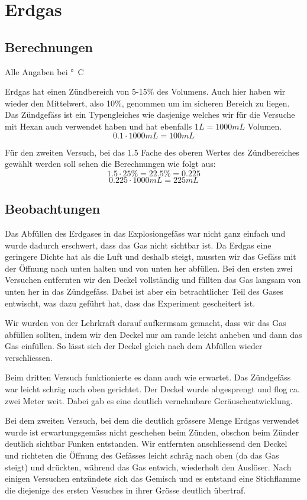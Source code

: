 \documentclass[11pt,paper=a4,final]{scrartcl}
\begin{document}
\section{Erdgas}
\subsection{Berechnungen}
Alle Angaben bei \unit[20]{°C}

Erdgas hat einen Z\"undbereich von 5-15\% des Volumens. Auch hier haben wir
wieder den Mittelwert, also 10\%, genommen um im sicheren Bereich zu liegen. Das
Z\"undgef\"ass ist ein Typengleiches wie dasjenige welches wir f\"ur die
Versuche mit Hexan auch verwendet haben und hat ebenfalls \(1L = 1000mL\)
Volumen.
\[ 0.1 \cdot 1000mL = 100mL \]

F\"ur den zweiten Versuch, bei das 1.5 Fache des oberen Wertes des
Z\"undbereiches gew\"ahlt werden soll sehen die Berechnungen wie folgt aus:
\[ 1.5 \cdot 25\% = 22.5\% = 0.225 \]
\[ 0.225 \cdot 1000mL = 225mL \]
\subsection{Beobachtungen}
Das Abf\"ullen des Erdgases in das Explosiongef\"ass war nicht ganz einfach und
wurde dadurch erschwert, dass das Gas nicht sichtbar ist. Da Erdgas eine
geringere Dichte hat als die Luft und deshalb steigt, mussten wir das Gef\"ass
mit der \"Offnung nach unten halten und von unten her abf\"ullen. Bei den ersten
zwei Versuchen entfernten wir den Deckel vollst\"andig und f\"ullten das Gas
langsam von unten her in das Z\"undgef\"ass. Dabei ist aber ein betrachtlicher
Teil des Gases entwischt, was dazu gef\"uhrt hat, dass das Experiment
gescheitert ist.

Wir wurden von der Lehrkraft darauf aufkermsam gemacht, dass wir das Gas
abf\"ullen sollten, indem wir den Deckel nur am rande leicht anheben und dann
das Gas einf\"ullen. So l\"asst sich der Deckel gleich nach dem Abf\"ullen
wieder verschliessen.

Beim dritten Versuch funktionierte es dann auch wie erwartet. Das Z\"undgef\"ass
war leicht schr\"ag nach oben gerichtet. Der Deckel wurde \glqq abgesprengt\grqq
und flog ca. zwei Meter weit. Dabei gab es eine deutlich vernehmbare
Ger\"auschentwicklung.

Bei dem zweiten Versuch, bei dem die deutlich gr\"ossere Menge Erdgas verwendet
wurde ist erwartungsgem\"ass nicht geschehen beim Z\"unden, obschon beim
Z\"under deutlich sichtbar Funken entstanden. Wir entfernten anschliessend den
Deckel und richteten die \"Offnung des Gef\"asses leicht schr\"ag nach oben (da
das Gas steigt) und dr\"uckten, w\"ahrend das Gas entwich, wiederholt den
Ausl\"oser. Nach einigen Versuchen entz\"undete sich das Gemisch und es entstand
eine Stichflamme die diejenige des ersten Vesuches in ihrer Gr\"osse deutlich
\"ubertraf.
\end{document}
